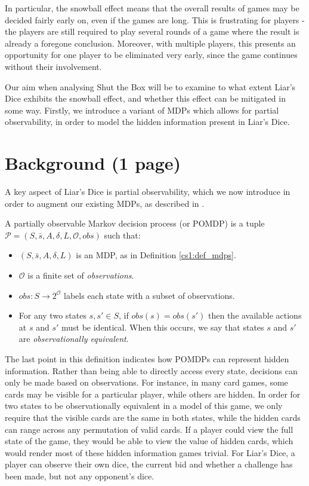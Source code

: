 In particular, the snowball effect means that the overall results of games may be decided fairly early on, even if the games are long. This is frustrating for players - the players are still required to play several rounds of a game where the result is already a foregone conclusion. Moreover, with multiple players, this presents an opportunity for one player to be eliminated very early, since the game continues without their involvement.

Our aim when analysing Shut the Box will be to examine to what extent Liar's Dice exhibits the snowball effect, and whether this effect can be mitigated in some way. Firstly, we introduce a variant of MDPs which allows for partial observability, in order to model the hidden information present in Liar's Dice.

\section{Background (1 page)}

A key aspect of Liar's Dice is partial observability, which we now introduce in order to augment our existing MDPs, as described in \cite{norman_verification_2017}.

\begin{definition}
    \label{cs2:def-pomdps}

    A partially observable Markov decision process (or POMDP) is a tuple $\mathcal{P} = (S, \bar{s}, A, \delta, L, \mathcal{O}, obs)$ such that:

    \begin{itemize}
        \item $(S, \bar{s}, A, \delta, L)$ is an MDP, as in Definition \ref{cs1:def_mdps}.
        \item $\mathcal{O}$ is a finite set of \emph{observations}.
        \item $obs : S \rightarrow 2^{\mathcal{O}}$ labels each state with a subset of observations.
        \item For any two states $s, s' \in S$, if $obs(s) = obs(s')$ then the available actions at $s$ and $s'$ must be identical. When this occurs, we say that states $s$ and $s'$ are \emph{observationally equivalent}.
    \end{itemize}
\end{definition}

The last point in this definition indicates how POMDPs can represent hidden information. Rather than being able to directly access every state, decisions can only be made based on observations. For instance, in many card games, some cards may be visible for a particular player, while others are hidden. In order for two states to be observationally equivalent in a model of this game, we only require that the visible cards are the same in both states, while the hidden cards can range across any permutation of valid cards. If a player could view the full state of the game, they would be able to view the value of hidden cards, which would render most of these hidden information games trivial. For Liar's Dice, a player can observe their own dice, the current bid and whether a challenge has been made, but not any opponent's dice.

